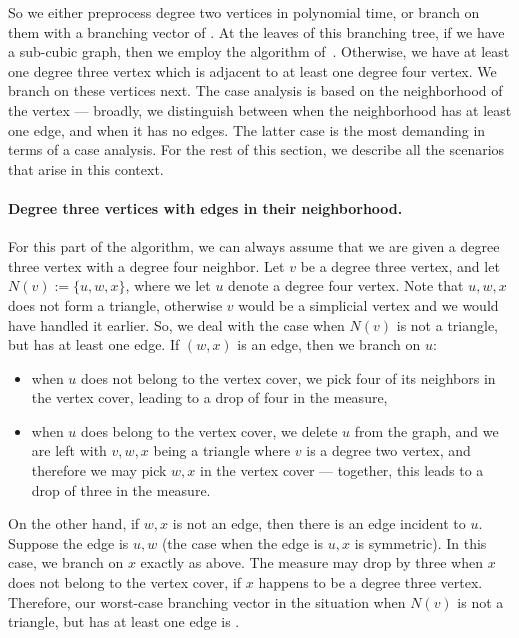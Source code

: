 \documentclass[svgnames]{llncs}
\newcommand{\branchvector}[1]{{\color{IndianRed}{$(#1)$}}}
\begin{document}
So we either preprocess degree two vertices in polynomial time, or branch on them with a branching vector of \branchvector{2,5}. At the leaves of this branching tree, if we have a sub-cubic graph,
then we employ the algorithm of~\cite{X10}. Otherwise, we have at least one degree three vertex which is adjacent to at least one degree four vertex. 
We branch on these vertices next. The case analysis is based on the neighborhood of the vertex --- broadly, we distinguish between when the neighborhood  
has at least one edge, and when it has no edges. The latter case is the most demanding in terms of a case analysis. For the rest of this section, we describe all the scenarios that arise in this context.






\paragraph{Degree three vertices with edges in their neighborhood.}

For this part of the algorithm, we can always assume that we are given a degree three vertex with a degree four neighbor. 
Let $v$ be a degree three vertex, and let~$N(v) := \{u,w,x\}$, where we let $u$ denote a degree four vertex.
Note that $u,w,x$ does not form a triangle, otherwise $v$ would be a simplicial vertex and we would have handled it earlier.
So, we deal with the case when $N(v)$ is not a triangle, but has at least one edge. If $(w,x)$ is an edge, then we branch on $u$:

\begin{itemize}
\item when $u$ does not belong to the vertex cover, we pick four of its neighbors in the vertex cover, leading to a drop of four in the measure,
\item when $u$ does belong to the vertex cover, we delete $u$ from the graph, and we are left with $v,w,x$ being a triangle where $v$ is a degree two vertex, and 
therefore we may pick $w,x$ in the vertex cover --- together, this leads to a drop of three in the measure. 
\end{itemize}



On the other hand, if $w,x$ is not an edge, then there is an edge incident to $u$. Suppose the edge is $u,w$ (the case when the edge is $u,x$ is symmetric). In this case, we branch on $x$ 
exactly as above. The measure may drop by three when $x$ does not belong to the vertex cover, if $x$ happens to be a degree three vertex. Therefore, our worst-case 
branching vector in the situation when $N(v)$ is not a triangle, but has at least one edge is \branchvector{3,3}.
\end{document}
